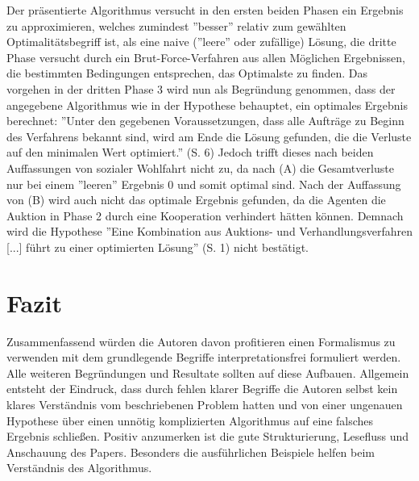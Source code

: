 \documentclass[sigconf]{acmart}
\theoremstyle{break}
\begin{document}
Der präsentierte Algorithmus versucht in den ersten beiden Phasen ein Ergebnis zu approximieren, welches zumindest ''besser'' relativ zum gewählten Optimalitätsbegriff ist, als eine naive (''leere'' oder zufällige) Lösung, die dritte Phase versucht durch ein Brut-Force-Verfahren aus allen Möglichen Ergebnissen, die bestimmten Bedingungen entsprechen, das Optimalste zu finden.
Das vorgehen in der dritten Phase 3 wird nun als Begründung genommen, dass der angegebene Algorithmus wie in der Hypothese behauptet, ein optimales Ergebnis berechnet:
''Unter den gegebenen Voraussetzungen, dass alle Aufträge zu Beginn des Verfahrens bekannt sind, wird am Ende die Lösung gefunden, die die Verluste auf den minimalen Wert optimiert.'' (S. 6)
Jedoch trifft dieses nach beiden Auffassungen von sozialer Wohlfahrt nicht zu, da nach (A) die Gesamtverluste nur bei einem ''leeren'' Ergebnis 0 und somit optimal sind. Nach der Auffassung von (B) wird auch nicht das optimale Ergebnis gefunden, da die Agenten die Auktion in Phase 2 durch eine Kooperation verhindert hätten können. Demnach wird die Hypothese ''Eine Kombination aus Auktions- und Verhandlungsverfahren [...] führt zu einer optimierten Lösung'' (S. 1) nicht bestätigt.


\section{Fazit}
\label{sec:fazit}
Zusammenfassend würden die Autoren davon profitieren einen Formalismus zu verwenden mit dem grundlegende Begriffe interpretationsfrei formuliert werden. Alle weiteren Begründungen und Resultate sollten auf diese Aufbauen. Allgemein entsteht der Eindruck, dass durch fehlen klarer Begriffe die Autoren selbst kein klares Verständnis vom beschriebenen Problem hatten und von einer ungenauen Hypothese über einen unnötig komplizierten Algorithmus auf eine falsches Ergebnis schließen.
Positiv anzumerken ist die gute Strukturierung, Lesefluss und Anschauung des Papers. Besonders die ausführlichen Beispiele helfen beim Verständnis des Algorithmus.
\end{document}
